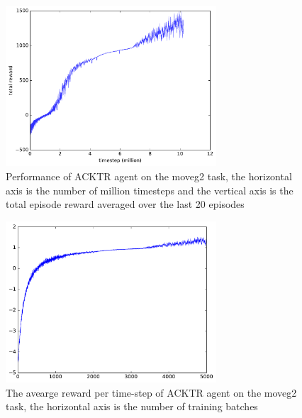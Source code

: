 \begin{figure}[!htbp]
	\includegraphics[width=0.7\textwidth]{images/rec_180528_statlog.pdf}
	\centering
	\caption{Performance of ACKTR agent on the moveg2 task, the horizontal axis is the number of million timesteps and the vertical axis is the total episode reward averaged over the last 20 episodes}\label{rec_stat_moveg2}
\end{figure}

\begin{figure}[!htbp]
	\includegraphics[width=0.7\textwidth]{images/rec_stat_moveg2_meanrt.pdf}
	\centering
	\caption{The avearge reward per time-step of ACKTR agent on the moveg2 task, the horizontal axis is the number of training batches}\label{rec_stat_moveg2_meanrt}
\end{figure}

